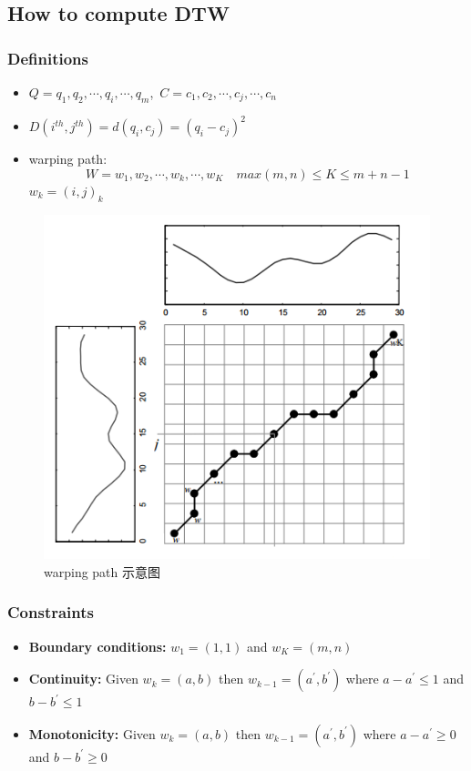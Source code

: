 \documentclass[xetex,mathserif,serif]{beamer}
\begin{document}
\subsection{How to compute DTW}
\begin{frame}
\frametitle{Definitions}
\begin{itemize}
  \item $Q = q_1,q_2,\cdots,q_i,\cdots,q_m$,\ $C = c_1,c_2,\cdots,c_j,\cdots,c_n$
  \item $D(i^{th},j^{th}) = d(q_i,c_j) = (q_i - c_j)^2$
  \item warping path: \ \[W = w_1,w_2,\cdots,w_k,\cdots,w_K \quad max(m,n) \le K \le m+n-1 \]
  $w_k = (i,j)_k$
\end{itemize}
\end{frame}

\begin{frame}
\begin{figure}
  \centering
  \includegraphics[width=.65\textwidth]{three_way_plot.png}
  \caption{warping path 示意图}\label{fig:2}
\end{figure}
\end{frame}

\begin{frame}
\frametitle{Constraints}
\begin{spacing}{1.2}
\begin{itemize}
  \item{\textbf{Boundary conditions: }}$w_1 = (1,1)$ and $w_K = (m,n)$
  \item{\textbf{Continuity: }}Given $w_k = (a,b)$ then $w_{k-1} = (a^{'},b^{'})$ where $a-a^{'} \le 1$ and $b-b^{'} \le 1$
  \item{\textbf{Monotonicity: }}Given $w_k = (a,b)$ then $w_{k-1} = (a^{'},b^{'})$ where $a-a^{'} \ge 0$ and $b-b^{'} \ge 0$
\end{itemize}
\end{spacing}
\end{frame}
\end{document}
